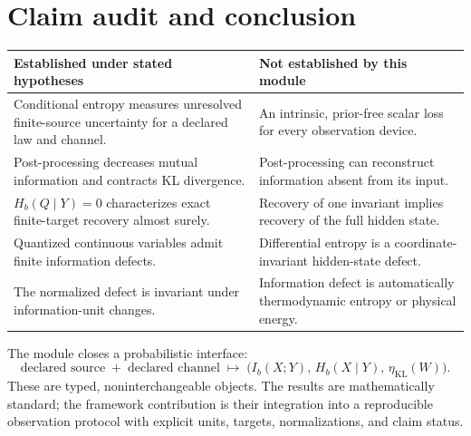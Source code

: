 \documentclass[11pt,a4paper]{article}
\theoremstyle{definition}
\theoremstyle{plain}
\theoremstyle{remark}
\newcommand{\1}{\mathbf{1}}
\newcommand{\Hb}{H_b}
\newcommand{\Ib}{I_b}
\begin{document}
\section{Claim audit and conclusion}

\begin{center}
\small
\begin{tabularx}{\linewidth}{@{}YY@{}}
\toprule
Established under stated hypotheses & Not established by this module\\
\midrule
Conditional entropy measures unresolved finite-source uncertainty for a
declared law and channel.
&
An intrinsic, prior-free scalar loss for every observation device.\\
Post-processing decreases mutual information and contracts KL divergence.
&
Post-processing can reconstruct information absent from its input.\\
$\Hb(Q\mid Y)=0$ characterizes exact finite-target recovery almost surely.
&
Recovery of one invariant implies recovery of the full hidden state.\\
Quantized continuous variables admit finite information defects.
&
Differential entropy is a coordinate-invariant hidden-state defect.\\
The normalized defect is invariant under information-unit changes.
&
Information defect is automatically thermodynamic entropy or physical
energy.\\
\bottomrule
\end{tabularx}
\end{center}

The module closes a probabilistic interface:
\[
\boxed{
\text{declared source}
\;+\;
\text{declared channel}
\;\longmapsto\;
\bigl(\Ib(X;Y),\,\Hb(X\mid Y),\,\eta_{\mathrm{KL}}(W)\bigr).
}
\]
These are typed, noninterchangeable objects. The results are mathematically
standard; the framework contribution is their integration into a
reproducible observation protocol with explicit units, targets,
normalizations, and claim status.
\end{document}
